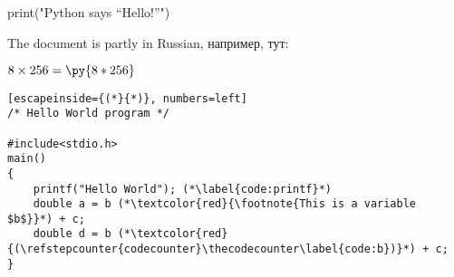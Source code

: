 \documentclass{article}
\newcommand{\pymultiply}[2]{\py{#1*#2}}
\begin{document}

\begin{pycode}
print("Python says ``Hello!''")
\end{pycode}

The document is partly in Russian, например, тут:

$8 \times 256 = \pymultiply{8}{256}$


\begin{lstlisting}[escapeinside={(*}{*)}, numbers=left]
/* Hello World program */

#include<stdio.h>
main()
{
    printf("Hello World"); (*\label{code:printf}*)
    double a = b (*\textcolor{red}{\footnote{This is a variable $b$}}*) + c;
    double d = b (*\textcolor{red}{(\refstepcounter{codecounter}\thecodecounter\label{code:b})}*) + c;
}

\end{lstlisting}
\end{document}
